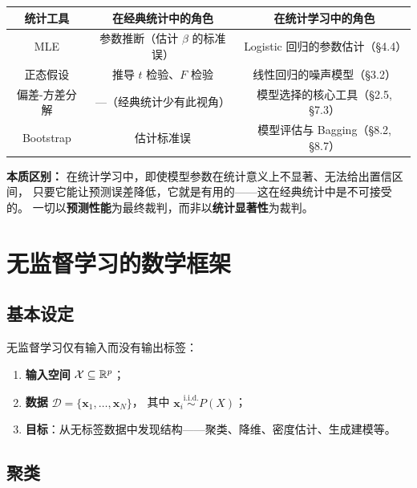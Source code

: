 \begin{center}
\renewcommand{\arraystretch}{1.4}
\begin{tabular}{c|c|c}
\toprule
\textbf{统计工具} & \textbf{在经典统计中的角色} & \textbf{在统计学习中的角色} \\
\midrule
MLE & 参数推断（估计 $\beta$ 的标准误） & Logistic 回归的参数估计（§4.4） \\
正态假设 & 推导 $t$ 检验、$F$ 检验 & 线性回归的噪声模型（§3.2） \\
偏差-方差分解 & —（经典统计少有此视角） & 模型选择的核心工具（§2.5, §7.3） \\
Bootstrap & 估计标准误 & 模型评估与 Bagging（§8.2, §8.7） \\
\bottomrule
\end{tabular}
\end{center}

\textbf{本质区别：} 在统计学习中，即使模型参数在统计意义上不显著、无法给出置信区间，
只要它能让预测误差降低，它就是有用的——这在经典统计中是不可接受的。
一切以\textbf{预测性能}为最终裁判，而非以\textbf{统计显著性}为裁判。

\section{无监督学习的数学框架}

\subsection{基本设定}

\begin{definition}[无监督学习的构成要素]
无监督学习仅有输入而没有输出标签：
\begin{enumerate}[label=(\roman*)]
    \item \textbf{输入空间} $\mathcal{X} \subseteq \mathbb{R}^p$；
    \item \textbf{数据} $\mathcal{D} = \{\mathbf{x}_1, \dots, \mathbf{x}_N\}$，
    其中 $\mathbf{x}_i \stackrel{\mathrm{i.i.d.}}{\sim} P(X)$；
    \item \textbf{目标}：从无标签数据中发现结构——聚类、降维、密度估计、生成建模等。
\end{enumerate}
\end{definition}

\subsection{聚类}

